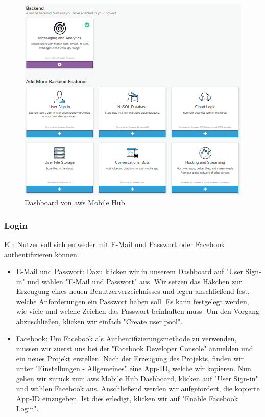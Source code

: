 \begin{figure}[h!]
	\centering
	\includegraphics[width=1\linewidth]{Pictures/MobileHubBackendOverview}
	\caption[Dashboard von \gls{aws} Mobile Hub]{Dashboard von \gls{aws} Mobile Hub}
	\label{fig:mobilehubbackendoverview}
\end{figure}

\subsubsection{Login}
Ein Nutzer soll sich entweder mit E-Mail und Passwort oder Facebook authentifizieren können. 

\begin{itemize}
	\item E-Mail und Passwort:
	Dazu klicken wir in unserem Dashboard auf "User Sign-in" und wählen "E-Mail und Passwort" aus. Wir setzen das Häkchen zur Erzeugung eines neuen Benutzerverzeichnisses und legen anschließend fest, welche Anforderungen ein Passwort haben soll. Es kann festgelegt werden, wie viele und welche Zeichen das Passwort beinhalten muss. Um den Vorgang abzuschließen, klicken wir einfach "Create user pool".
	\item Facebook:
	Um Facebook als Authentifizierungsmethode zu verwenden, müssen wir zuerst uns bei der "Facebook Developer Console" anmelden und ein neues Projekt erstellen. Nach der Erzeugung des Projekts, finden wir unter "Einstellungen - Allgemeines" eine App-ID, welche wir kopieren. Nun gehen wir zurück zum \gls{aws} Mobile Hub Dashboard, klicken auf "User Sign-in" und wählen Facebook aus. Anschließend werden wir aufgefordert, die kopierte App-ID einzugeben. Ist dies erledigt, klicken wir auf "Enable Facebook Login".
\end{itemize}


